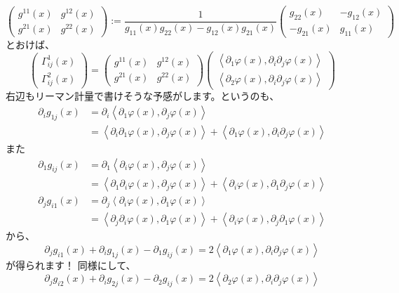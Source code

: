 \[
  \begin{pmatrix}
    g^{11}(x) & g^{12}(x)\\
    g^{21}(x) & g^{22}(x)
  \end{pmatrix}
  :=
  \frac{1}{g_{11}(x)g_{22}(x)-g_{12}(x)g_{21}(x)}
  \begin{pmatrix}
    g_{22}(x) & -g_{12}(x)\\
    -g_{21}(x) & g_{11}(x)
  \end{pmatrix}
\]
とおけば、
\[
  \begin{pmatrix}
    \Gamma_{ij}^1(x) \\ \Gamma_{ij}^2(x)
  \end{pmatrix}
  =
  \begin{pmatrix}
    g^{11}(x) & g^{12}(x)\\
    g^{21}(x) & g^{22}(x)
  \end{pmatrix}
  \begin{pmatrix}
    \left<\partial_1\varphi(x),\partial_i\partial_j\varphi(x)\right>\\
    \left<\partial_2\varphi(x),\partial_i\partial_j\varphi(x)\right>
  \end{pmatrix}
\]
右辺もリーマン計量で書けそうな予感がします。というのも、
\begin{align*}
  \partial_ig_{1j}(x)&=\partial_i\left<\partial_1\varphi(x),\partial_j\varphi(x)\right>\\
  &=\left<\partial_i\partial_1\varphi(x),\partial_j\varphi(x)\right>+\left<\partial_1\varphi(x),\partial_i\partial_j\varphi(x)\right>
\end{align*}
また
\begin{align*}
  \partial_1g_{ij}(x)&=\partial_1\left<\partial_i\varphi(x),\partial_j\varphi(x)\right>\\
  &=\left<\partial_1\partial_i\varphi(x),\partial_j\varphi(x)\right>+\left<\partial_i\varphi(x),\partial_1\partial_j\varphi(x)\right>
\end{align*}
\begin{align*}
  \partial_jg_{i1}(x)&=\partial_j\left<\partial_i\varphi(x),\partial_1\varphi(x)\right>\\
  &=\left<\partial_j\partial_i\varphi(x),\partial_1\varphi(x)\right>+\left<\partial_i\varphi(x),\partial_j\partial_1\varphi(x)\right>
\end{align*}
から、
\[
  \partial_jg_{i1}(x)+\partial_ig_{1j}(x)-\partial_1g_{ij}(x)=2\left<\partial_1\varphi(x),\partial_i\partial_j\varphi(x)\right>
\]
が得られます！
同様にして、
\[
  \partial_jg_{i2}(x)+\partial_ig_{2j}(x)-\partial_2g_{ij}(x)=2\left<\partial_2\varphi(x),\partial_i\partial_j\varphi(x)\right>
\]
